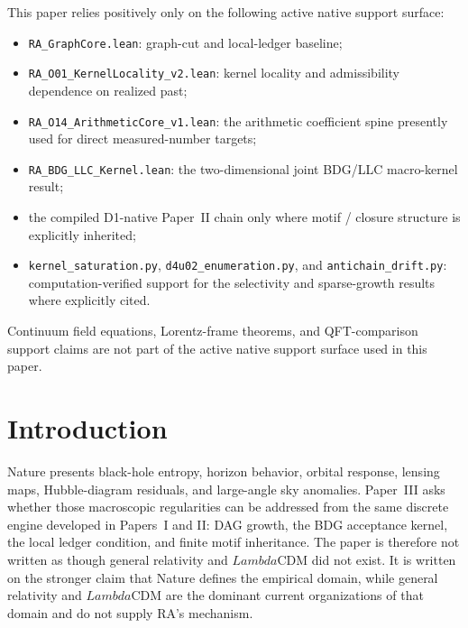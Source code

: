 \documentclass[11pt]{article}
\def\Lambda{Lambda}%
\begin{document}
\begin{tcolorbox}[title=Active Native Support Surface Used Positively,colback=gray!5,colframe=gray!60]
This paper relies positively only on the following active native support surface:
\begin{itemize}[nosep]
    \item \texttt{RA\_GraphCore.lean}: graph-cut and local-ledger baseline;
    \item \texttt{RA\_O01\_KernelLocality\_v2.lean}: kernel locality and admissibility dependence on realized past;
    \item \texttt{RA\_O14\_ArithmeticCore\_v1.lean}: the arithmetic coefficient spine presently used for direct measured-number targets;
    \item \texttt{RA\_BDG\_LLC\_Kernel.lean}: the two-dimensional joint BDG/LLC macro-kernel result;
    \item the compiled D1-native Paper~II chain only where motif / closure structure is explicitly inherited;
    \item \texttt{kernel\_saturation.py}, \texttt{d4u02\_enumeration.py}, and \texttt{antichain\_drift.py}: computation-verified support for the selectivity and sparse-growth results where explicitly cited.
\end{itemize}
Continuum field equations, Lorentz-frame theorems, and QFT-comparison support claims are not part of the active native support surface used in this paper.
\end{tcolorbox}

\section{Introduction}

Nature presents black-hole entropy, horizon behavior, orbital response, lensing maps, Hubble-diagram residuals, and large-angle sky anomalies. Paper~III asks whether those macroscopic regularities can be addressed from the same discrete engine developed in Papers~I and II: DAG growth, the BDG acceptance kernel, the local ledger condition, and finite motif inheritance. The paper is therefore not written as though general relativity and $\Lambda$CDM did not exist. It is written on the stronger claim that Nature defines the empirical domain, while general relativity and $\Lambda$CDM are the dominant current organizations of that domain and do not supply RA's mechanism.
\end{document}
